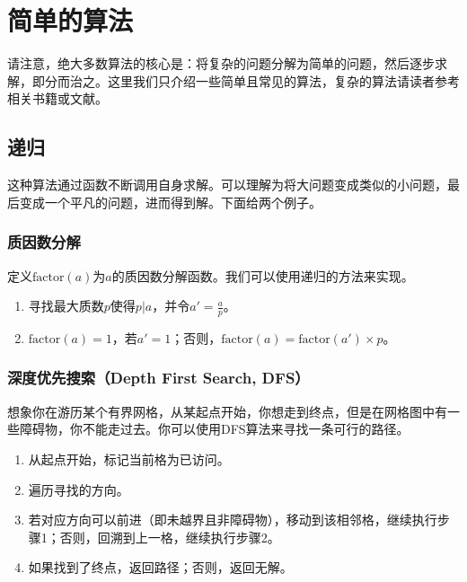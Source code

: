 \documentclass[a4paper, 12pt]{article}
\begin{document}
    \section{简单的算法}

    请注意，绝大多数算法的核心是：将复杂的问题分解为简单的问题，然后逐步求解，即分而治之。这里我们只介绍一些简单且常见的算法，复杂的算法请读者参考相关书籍或文献。

    \subsection{递归}

    这种算法通过函数不断调用自身求解。可以理解为将大问题变成类似的小问题，最后变成一个平凡的问题，进而得到解。下面给两个例子。

    \subsubsection{质因数分解}

    定义$\mathrm{factor}(a)$为$a$的质因数分解函数。我们可以使用递归的方法来实现。
    
    \begin{enumerate}
        \item 寻找最大质数$p$使得$p|a$，并令$a'=\frac{a}{p}$。
        \item $\mathrm{factor}(a)=1$，若$a'=1$；否则，$\mathrm{factor}(a)=\mathrm{factor}(a')\times p$。
    \end{enumerate}

    \subsubsection{深度优先搜索（Depth First Search, DFS）}

    想象你在游历某个有界网格，从某起点开始，你想走到终点，但是在网格图中有一些障碍物，你不能走过去。你可以使用DFS算法来寻找一条可行的路径。

    \begin{enumerate}
        \item 从起点开始，标记当前格为已访问。
        \item 遍历寻找的方向。
        \item 若对应方向可以前进（即未越界且非障碍物），移动到该相邻格，继续执行步骤1；否则，回溯到上一格，继续执行步骤2。
        \item 如果找到了终点，返回路径；否则，返回无解。
    \end{enumerate}
\end{document}
